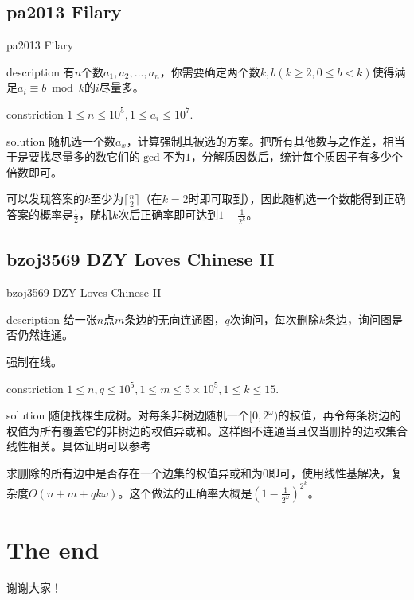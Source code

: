 \documentclass{beamer}
\begin{document}
	\subsection{pa2013 Filary}
	\begin{frame}{pa2013 Filary}
		\begin{block}{description}
			有$n$个数$a_1,a_2,...,a_n$，你需要确定两个数$k,b(k \ge 2, 0 \le b < k)$使得满足$a_i \equiv b \bmod k$的$i$尽量多。
		\end{block}
		\begin{block}{constriction}
			$1 \le n \le 10^5, 1 \le a_i \le 10^7.$
		\end{block}
		\pause
		\begin{block}{solution}
			随机选一个数$a_x$，计算强制其被选的方案。把所有其他数与之作差，相当于是要找尽量多的数它们的$\gcd$不为$1$，分解质因数后，统计每个质因子有多少个倍数即可。
			
			可以发现答案的$k$至少为$\lceil\frac n2\rceil$（在$k=2$时即可取到），因此随机选一个数能得到正确答案的概率是$\frac{1}{2}$，随机$k$次后正确率即可达到$1-\frac{1}{2^k}$。
		\end{block}
	\end{frame}
	\subsection{bzoj3569 DZY Loves Chinese II}
	\begin{frame}{bzoj3569 DZY Loves Chinese II}
		\begin{block}{description}
			给一张$n$点$m$条边的无向连通图，$q$次询问，每次删除$k$条边，询问图是否仍然连通。
			
			强制在线。
		\end{block}
		\begin{block}{constriction}
			$1 \le n, q \le 10^5, 1 \le m \le 5\times 10^5, 1 \le k \le 15.$
		\end{block}
		\pause
		\begin{block}{solution}
			随便找棵生成树。对每条非树边随机一个$[0,2^{\omega})$的权值，再令每条树边的权值为所有覆盖它的非树边的权值异或和。这样图不连通当且仅当删掉的边权集合线性相关。具体证明可以参考\href{http://wuhongxun.blog.uoj.ac/blog/3003}{\color{pink}{这篇博客}}
			
			求删除的所有边中是否存在一个边集的权值异或和为$0$即可，使用线性基解决，复杂度$O(n+m+qk\omega)$。这个做法的正确率\sout{大概}是$(1-\frac{1}{2^{\omega}})^{2^k}$。
		\end{block}
	\end{frame}
	\section{The end}
	\begin{frame}{}
		\begin{center}
			{\Huge 谢谢大家！}
		\end{center}
	\end{frame}
\end{document}
